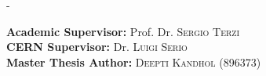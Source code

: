 \begin{titlingpage}
\begin{SingleSpace}
\begin{adjustwidth*}{\unitlength}{-\unitlength}
\vspace{8mm}
\begin{flushleft}
{\LARGE \textbf{Academic Supervisor:} Prof. Dr. \textsc{Sergio Terzi}}\\ 
\vspace{2mm}
{\LARGE \textbf{CERN Supervisor:} Dr. \textsc{Luigi Serio}}\\ 
\vspace{2mm}
{\LARGE  \textbf{Master Thesis Author:} \textsc{Deepti Kandhol (896373)}}\\ 

\end{flushleft}




\end{adjustwidth*}
\end{SingleSpace}
\end{titlingpage}